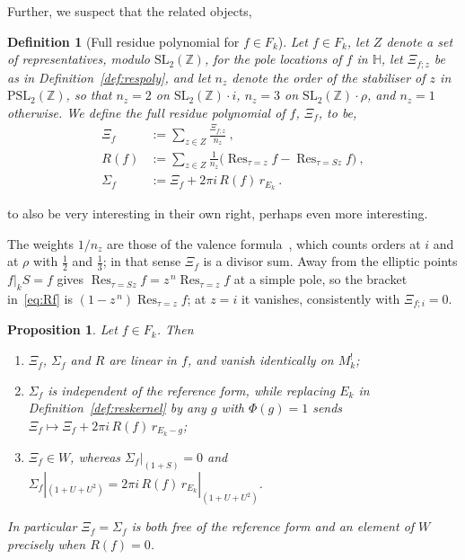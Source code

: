 \documentclass[11pt]{article}
\newtheorem{proposition}[theorem]{Proposition}
\newtheorem{definition}[theorem]{Definition}
\newcommand{\HH}{\mathbb{H}}
\newcommand{\ZZ}{\mathbb{Z}}
\newcommand{\SLZ}{\mathrm{SL}_2(\ZZ)}
\DeclareMathOperator{\Res}{Res}
\begin{document}
Further, we suspect that the related objects,
\begin{definition}[Full residue polynomial for $f \in F_k$]\label{def:respolyfull}
Let $f \in F_k$, let $Z$ denote a set of representatives, modulo $\SLZ$, for the pole locations of
$f$ in $\HH$, let $\Xi_{f;z}$ be as in Definition~\ref{def:respoly}, and let $n_z$ denote
the order of the stabiliser of $z$ in $\mathrm{PSL}_2(\ZZ)$, so that $n_z=2$ on $\SLZ\!\cdot\!i$,
$n_z=3$ on $\SLZ\!\cdot\!\rho$, and $n_z=1$ otherwise. We define \emph{the full residue polynomial
of $f$}, $\Xi_f$, to be,
\begin{align}
\Xi_f &:= \sum_{z \in Z} \frac{\Xi_{f;z}}{n_z}~,\label{eq:respolyfull}\\
R(f) &:= \sum_{z \in Z} \frac{1}{n_z}\Big(\Res_{\tau = z} f-\Res_{\tau = Sz} f\Big)~,\label{eq:Rf}\\
\Sigma_f &:= \Xi_f + 2\pi i\,R(f)\,r_{E_k}~.\label{eq:Sigmaf}
\end{align}
\end{definition}
to also be very interesting in their own right, perhaps even more interesting.

The weights $1/n_z$ are those of the valence formula~\cite{01-Apostol}, which counts orders at $i$
and at $\rho$ with $\tfrac12$ and $\tfrac13$; in that sense $\Xi_f$ is a divisor sum. Away from the
elliptic points $f|_kS=f$ gives $\Res_{\tau=Sz}f=z^{\,n}\Res_{\tau=z}f$ at a simple pole, so the
bracket in~\eqref{eq:Rf} is $(1-z^{\,n})\Res_{\tau=z}f$; at $z=i$ it vanishes, consistently with
$\Xi_{f;i}=0$.

\begin{proposition}\label{prop:resamb}
Let $f \in F_k$. Then
\begin{enumerate}
\item $\Xi_f$, $\Sigma_f$ and $R$ are linear in $f$, and vanish identically on $M^!_k$;
\item $\Sigma_f$ is independent of the reference form, while replacing $E_k$ in
Definition~\ref{def:reskernel} by any $g$ with $\Phi(g)=1$ sends
$\Xi_f \mapsto \Xi_f + 2\pi i\,R(f)\,r_{E_k-g}$;
\item $\Xi_f \in W$, whereas $\Sigma_f|_{(1+S)}=0$ and
$\Sigma_f|_{(1+U+U^2)} = 2\pi i\,R(f)\,r_{E_k}|_{(1+U+U^2)}$.
\end{enumerate}
In particular $\Xi_f=\Sigma_f$ is both free of the reference form and an element of $W$ precisely
when $R(f)=0$.
\end{proposition}
\end{document}
